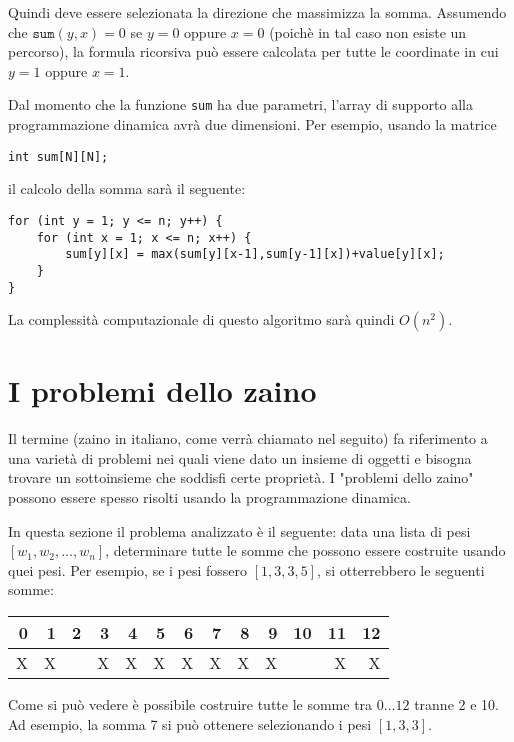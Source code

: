 Quindi deve essere selezionata la direzione che massimizza
la somma.
Assumendo che $\texttt{sum}(y,x)=0$
se $y=0$ oppure $x=0$ (poichè in tal caso non esiste un percorso),
la formula ricorsiva può essere calcolata per tutte le 
coordinate in cui $y=1$ oppure $x=1$.

Dal momento che la funzione \texttt{sum} ha due parametri,
l'array di supporto alla programmazione dinamica avrà due
dimensioni.
Per esempio, usando la matrice
\begin{lstlisting}
int sum[N][N];
\end{lstlisting}
il calcolo della somma sarà il seguente:
\begin{lstlisting}
for (int y = 1; y <= n; y++) {
    for (int x = 1; x <= n; x++) {
        sum[y][x] = max(sum[y][x-1],sum[y-1][x])+value[y][x];
    }
}
\end{lstlisting}
La complessità computazionale di questo algoritmo sarà quindi $O(n^2)$.

\section{I problemi dello zaino}


Il termine (zaino in italiano, come verrà chiamato nel seguito)
fa riferimento a una varietà di problemi
nei quali viene dato un insieme di oggetti
e bisogna trovare un sottoinsieme
che soddisfi certe proprietà.
I "problemi dello zaino" possono essere
spesso risolti usando la programmazione dinamica.

In questa sezione il problema analizzato
è il seguente: data una lista di pesi
$[w_1,w_2,\ldots,w_n]$,
determinare tutte le somme che possono essere 
costruite usando quei pesi.
Per esempio, se i pesi fossero
$[1,3,3,5]$, si otterrebbero le seguenti somme:

\begin{center}
\begin{tabular}{rrrrrrrrrrrrr}
 0 & 1 & 2 & 3 & 4 & 5 & 6 & 7 & 8 & 9 & 10 & 11 & 12 \\
\hline
 X & X & & X & X & X & X & X & X & X & & X & X \\
\end{tabular}
\end{center}

Come si può vedere è possibile costruire tutte le somme
tra $0 \ldots 12$ tranne 2 e 10.
Ad esempio, la somma 7 si può ottenere selezionando
i pesi $[1,3,3]$.

